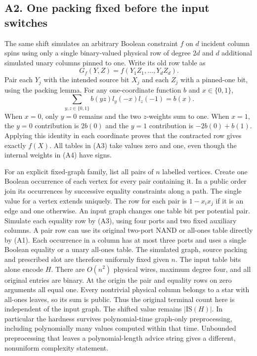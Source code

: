 \documentclass[
  11pt,
]{article}
\begin{document}
\subsection{A2. One packing fixed before the input
switches}\label{v9-a2-one-packing-fixed-before-the-input-switches}

The same shift simulates an arbitrary Boolean constraint \(f\) on \(d\)
incident column spins using only a single binary-valued physical row of
degree \(2d\) and \(d\) additional simulated unary columns pinned to
one. Write its old row table as \[
       G_f(Y,Z)= f(Y_1Z_1,\ldots,Y_dZ_d).
\tag{A3}
\] Pair each \(Y_j\) with the intended source bit \(X_j\) and each
\(Z_j\) with a pinned-one bit, using the packing lemma. For any
one-coordinate function \(b\) and \(x\in\{0,1\}\), \[
        \sum_{y,z\in\{0,1\}} b(yz)l_y(-x)l_z(-1)=b(x).
\tag{A4}
\] When \(x=0\), only \(y=0\) remains and the two \(z\)-weights sum to
one. When \(x=1\), the \(y=0\) contribution is \(2b(0)\) and the \(y=1\)
contribution is \(-2b(0)+b(1)\). Applying this identity in each
coordinate proves that the contracted row gives exactly \(f(X)\). All
tables in (A3) take values zero and one, even though the internal
weights in (A4) have signs.

For an explicit fixed-graph family, list all pairs of \(n\) labelled
vertices. Create one Boolean occurrence of each vertex for every pair
containing it. In a public order join its occurrences by successive
equality constraints along a path. The single value for a vertex extends
uniquely. The row for each pair is \(1-x_ix_j\) if it is an edge and one
otherwise. An input graph changes one table bit per potential pair.
Simulate each equality row by (A3), using four ports and two fixed
auxiliary columns. A pair row can use its original two-port NAND or
all-ones table directly by (A1). Each occurrence in a column has at most
three ports and uses a single Boolean equality or a unary all-ones
table. The simulated graph, source packing and prescribed slot are
therefore uniformly fixed given \(n\). The input table bits alone encode
\(H\). There are \(O(n^2)\) physical wires, maximum degree four, and all
original entries are binary. At the origin the pair and equality rows on
zero arguments all equal one. Every nontrivial physical column belongs
to a star with all-ones leaves, so its sum is public. Thus the original
terminal count here is independent of the input graph. The shifted value
remains \(|\mathrm{IS}(H)|\). In particular the hardness survives
polynomial-time graph-only preprocessing, including polynomially many
values computed within that time. Unbounded preprocessing that leaves a
polynomial-length advice string gives a different, nonuniform complexity
statement.
\end{document}
